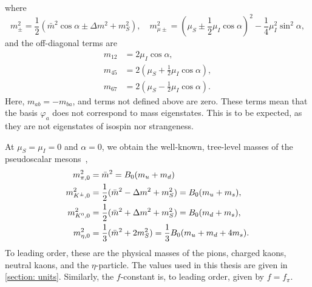 \endgroup
%
where
%
\begin{equation}
    \label{mass terms in pion condensate}
    m_\pm^2 = \frac{1}{2} (\bar m^2 \cos\alpha \pm \Delta m^2 + m_S^2),
    \quad
    m^2_{\mu\pm } = \left(\mu_S \pm \frac{1}{2}\mu_I\cos\alpha \right)^2 
    - \frac{1}{4}\mu_I^2 \sin^2\alpha,
\end{equation}
and the off-diagonal terms are
\begin{align}
    \label{m12}
    m_{12} & = 2 \mu_I\cos\alpha,\\
    m_{45} & = 2 \left( \mu_S + \frac{1}{2} \mu_I  \cos\alpha\right), \\
    \label{m76}
    m_{67} & =  2 \left( \mu_S - \frac{1}{2} \mu_I  \cos\alpha\right).
\end{align}
%
Here, $m_{ab} = -m_{ba}$, and terms not defined above are zero.
These terms mean that the basis $\varphi_a$ does not correspond to mass eigenstates.
This is to be expected, as they are not eigenstates of isospin nor strangeness.

At $\mu_S = \mu_I = 0$ and $\alpha = 0$, we obtain the well-known, tree-level masses of the pseudoscalar mesons~\autocite{eckerChiralPerturbationTheory1995},
%
\begin{align}
    \label{leading order pion mass mu=0}
    m_{\pi,0}^2 &
    = \bar m^2 
    = B_0(m_u + m_d)\\
    \label{leading order charged kaon mass mu=0}
    m_{{K^\pm}, 0}^2 
    & = \frac{1}{2} (\bar m^2 - \Delta m^2 + m_S^2) 
    = B_0(m_u + m_s), \\
    \label{leading order neutral kaon mass mu=0}
    m_{{K^0}, 0}^2
    & = \frac{1}{2} (\bar m^2 + \Delta m^2 + m_S^2) 
    = B_0(m_d + m_s), \\
    \label{leading order eta mass mu=0}
    m_{\eta, 0}^2
    &= \frac{1}{3}(\bar m^2  + 2m_S^2) 
    = \frac{1}{3}B_0(m_u + m_d + 4m_s).
\end{align}
%
To leading order, these are the physical masses of the pions, charged kaons, neutral kaons, and the $\eta$-particle.
The values used in this thesis are given in \autoref{section: units}.
Similarly, the $f$-constant is, to leading order, given by $f = f_\pi$.

